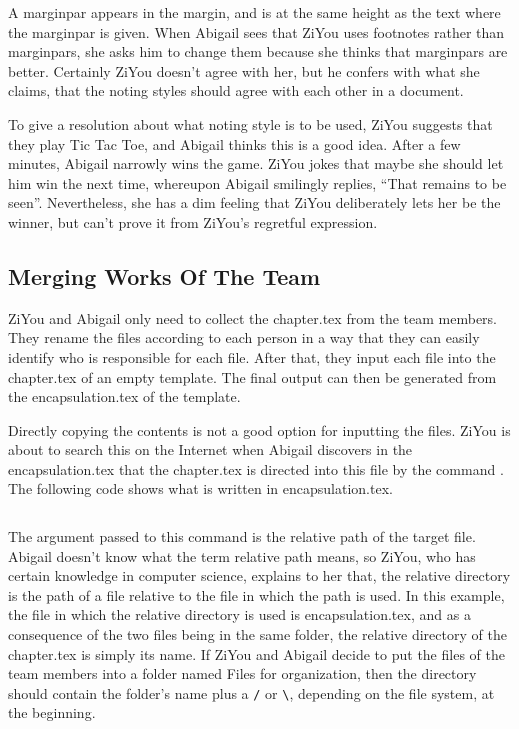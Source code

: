 A marginpar appears in the margin, and is at the same height as the text where the marginpar is given. When Abigail sees that ZiYou uses footnotes rather than marginpars, she asks him to change them because she thinks that marginpars are better. Certainly ZiYou doesn't agree with her, but he confers with what she claims, that the noting styles should agree with each other in a document.

To give a resolution about what noting style is to be used, ZiYou suggests that they play Tic Tac Toe, and Abigail thinks this is a good idea. After a few minutes, Abigail narrowly wins the game. ZiYou jokes that maybe she should let him win the next time, whereupon Abigail smilingly replies, ``That remains to be seen''. Nevertheless, she has a dim feeling that ZiYou deliberately lets her be the winner, but can't prove it from ZiYou's regretful expression.

\subsection{Merging Works Of The Team}
ZiYou and Abigail only need to collect the chapter.tex from the team members. They rename the files according to each person in a way that they can easily identify who is responsible for each file. After that, they input each file into the chapter.tex of an empty template. The final output can then be generated from the encapsulation.tex of the template.

Directly copying the contents is not a good option for inputting the files. ZiYou is about to search this on the Internet when Abigail discovers in the encapsulation.tex that the chapter.tex is directed into this file by the command \verb==. The following code shows what is written in encapsulation.tex.
\begin{lstlisting}

\end{lstlisting}
The argument passed to this command is the relative path of the target file. Abigail doesn't know what the term relative path means, so ZiYou, who has certain knowledge in computer science, explains to her that, the relative directory is the path of a file relative to the file in which the path is used. In this example, the file in which the relative directory is used is encapsulation.tex, and as a consequence of the two files being in the same folder, the relative directory of the chapter.tex is simply its name. If ZiYou and Abigail decide to put the files of the team members into a folder named Files for organization, then the directory should contain the folder's name plus a \verb=/= or \verb=\=, depending on the file system, at the beginning.

